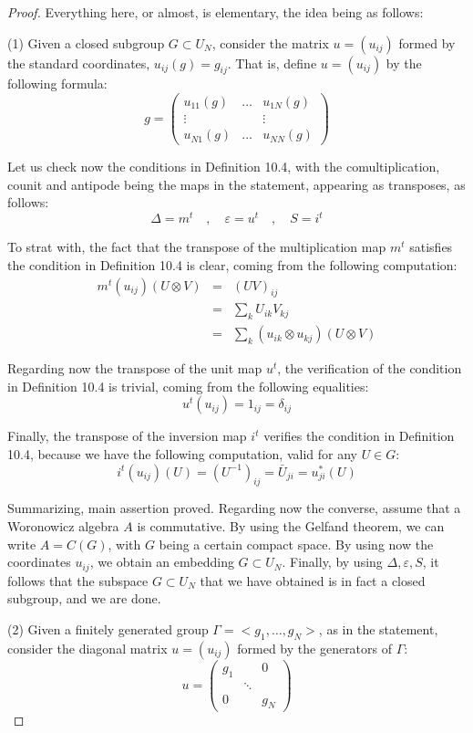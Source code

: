 \documentclass[12pt]{amsbook}
\begin{document}
\begin{proof}
Everything here, or almost, is elementary, the idea being as follows:

\medskip

(1) Given a closed subgroup $G\subset U_N$, consider the matrix $u=(u_{ij})$ formed by the standard coordinates, $u_{ij}(g)=g_{ij}$. That is, define $u=(u_{ij})$ by the following formula:
$$g=\begin{pmatrix}
u_{11}(g)&\ldots&u_{1N}(g)\\
\vdots&&\vdots\\
u_{N1}(g)&\ldots&u_{NN}(g)
\end{pmatrix}$$

Let us check now the conditions in Definition 10.4, with the comultiplication, counit and antipode being the maps in the statement, appearing as transposes, as follows:
$$\Delta=m^t\quad,\quad\varepsilon=u^t\quad,\quad S=i^t$$

To strat with, the fact that the transpose of the multiplication map $m^t$ satisfies the condition in Definition 10.4 is clear, coming from the following computation:
\begin{eqnarray*}
m^t(u_{ij})(U\otimes V)
&=&(UV)_{ij}\\
&=&\sum_kU_{ik}V_{kj}\\
&=&\sum_k(u_{ik}\otimes u_{kj})(U\otimes V)
\end{eqnarray*}

Regarding now the transpose of the unit map $u^t$, the verification of the condition in Definition 10.4 is trivial, coming from the following equalities:
$$u^t(u_{ij})
=1_{ij}
=\delta_{ij}$$

Finally, the transpose of the inversion map $i^t$ verifies the condition in Definition 10.4, because we have the following computation, valid for any $U\in G$:
$$i^t(u_{ij})(U)
=(U^{-1})_{ij}
=\bar{U}_{ji}
=u_{ji}^*(U)$$

Summarizing, main assertion proved. Regarding now the converse, assume that a Woronowicz algebra $A$ is commutative. By using the Gelfand theorem, we can write $A=C(G)$, with $G$ being a certain compact space. By using now the coordinates $u_{ij}$, we obtain an embedding $G\subset U_N$. Finally, by using $\Delta,\varepsilon,S$, it follows that the subspace $G\subset U_N$ that we have obtained is in fact a closed subgroup, and we are done.

\medskip

(2) Given a finitely generated group $\Gamma=<g_1,\ldots,g_N>$, as in the statement, consider the diagonal matrix $u=(u_{ij})$ formed by the generators of $\Gamma$:
$$u=\begin{pmatrix}
g_1&&0\\
&\ddots&\\
0&&g_N
\end{pmatrix}$$


\end{proof}
\end{document}
